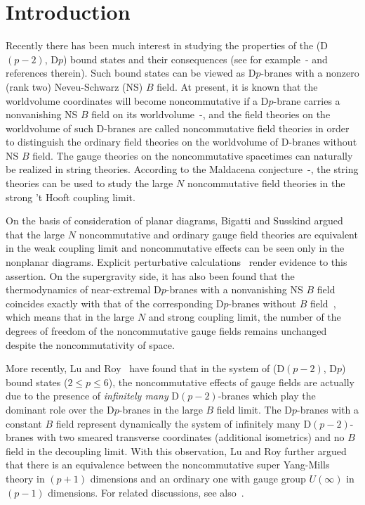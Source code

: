 \documentclass[a4paper,12pt]{article}
\newcommand{\sect}[1]{\setcounter{equation}{0}\section{#1}}
\begin{document}
\newpage
\renewcommand{\thefootnote}{\arabic{footnote}}
\setcounter{footnote}{0}
\setcounter{page}{2}


\sect{Introduction}

Recently there has been much interest in studying the properties of
the (D$(p-2)$, D$p$) bound states and their consequences (see for
example~\cite{Hashimoto1}-\cite{Lu} and references therein).
Such bound states can be viewed as D$p$-branes with a nonzero (rank two)
Neveu-Schwarz (NS) $B$ field. At present, it is known that the worldvolume
coordinates will become noncommutative if a D$p$-brane carries a
nonvanishing NS $B$ field on its worldvolume~\cite{Li}-\cite{Seiberg},
and the field theories on the worldvolume of such D-branes are called
noncommutative field theories in order to distinguish the ordinary field
theories on the worldvolume of D-branes without NS $B$ field. The gauge
theories on the noncommutative spacetimes can naturally be realized in
string theories. According to the Maldacena
conjecture~\cite{Mald2}-\cite{Itzhaki}, the string theories can be used to
study the large $N$ noncommutative field theories in the strong 't Hooft
coupling limit.

On the basis of consideration of planar diagrams, Bigatti and Susskind
\cite{BS} argued that the large $N$ noncommutative and ordinary gauge field
theories are equivalent in the weak coupling limit and noncommutative
effects can be seen only in the nonplanar diagrams. Explicit perturbative
calculations~\cite{Arcioni} render evidence to this assertion. On the
supergravity side, it has also been found that the thermodynamics of
near-extremal D$p$-branes with a nonvanishing NS $B$ field coincides exactly
with that of the corresponding D$p$-branes without $B$
field~\cite{Mald1,Ali,Bar,CO,Harmark}, which means that in the large $N$
and strong coupling limit, the number of the degrees of freedom of
the noncommutative gauge fields remains unchanged despite the
noncommutativity of space.

More recently, Lu and Roy~\cite{Lu} have found that in the system of
(D$(p-2)$, D$p$) bound states ($2 \le p \le 6$), the noncommutative effects
of gauge fields are actually due to the presence of {\it infinitely many}
D$(p-2)$-branes which play the dominant role over the D$p$-branes in the
large $B$ field limit. The D$p$-branes with a constant $B$ field represent
dynamically the system of infinitely many D$(p-2)$-branes with two smeared
transverse coordinates (additional isometrics) and no $B$ field in the
decoupling limit. With this observation, Lu and Roy further argued that
there is an equivalence between the noncommutative super Yang-Mills theory
in $(p+1)$ dimensions and an ordinary one with gauge group $U(\infty)$ in
$(p-1)$ dimensions. For related discussions, see
also~\cite{T,Ishibashi1,Ishibashi2,CS,Corn,Kato}.
\end{document}
